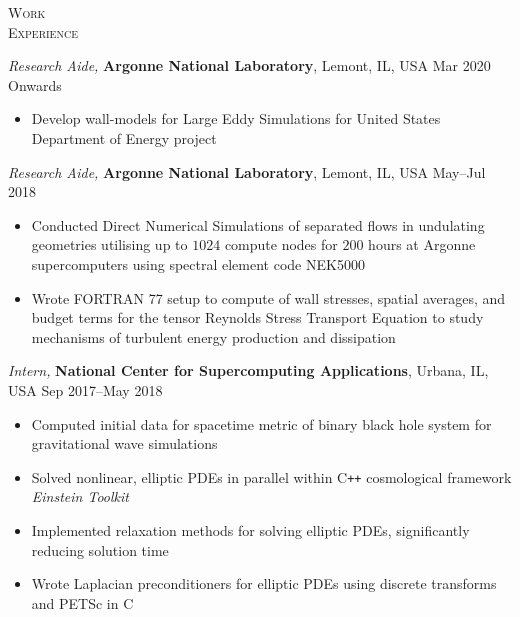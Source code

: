 \documentclass[10pt]{article}
\begin{document}
\begin{multicols}{2}
\textsc{\small Work \\ Experience}
\columnbreak

{\sl Research Aide,} \textbf{Argonne National Laboratory}, Lemont, IL, USA \hfill Mar 2020 Onwards

\vspace{-1.75em}
\begin{itemize}[label=-]
    \setlength\itemsep{-0.25em}
    \item Develop wall-models for Large Eddy Simulations for United States Department of Energy project
\end{itemize}
\vspace{-2.0em}

\vspace{0.5em}
%
{\sl Research Aide,} \textbf{Argonne National Laboratory}, Lemont, IL, USA \hfill May--Jul 2018

\vspace{-1.75em}
\begin{itemize}[label=-]
    \setlength\itemsep{-0.25em}
    \item Conducted Direct Numerical Simulations of separated flows in undulating geometries utilising up to $1024$ compute nodes for $200$ hours at Argonne supercomputers using spectral element code NEK5000
    \item Wrote FORTRAN 77 setup to compute of wall stresses, spatial averages, and budget terms for the tensor Reynolds Stress Transport Equation to study mechanisms of turbulent energy production and dissipation
\end{itemize}
\vspace{-2.0em}

\vspace{0.5em}
%
{\sl Intern,} \textbf{National Center for Supercomputing Applications}, Urbana, IL, USA \hfill Sep 2017--May 2018

\vspace{-1.75em}
\begin{itemize}[label=-]
    \setlength\itemsep{-0.25em}
    \item Computed initial data for spacetime metric of binary black hole system for gravitational wave simulations
    \item Solved nonlinear, elliptic PDEs in parallel within C\texttt{++} cosmological framework \textit{Einstein Toolkit}
    \item Implemented relaxation methods for solving elliptic PDEs, significantly reducing solution time
    \item Wrote Laplacian preconditioners for elliptic PDEs using discrete transforms and PETSc in C
\end{itemize}
\vspace{-2.0em}


\end{multicols}
\end{document}
